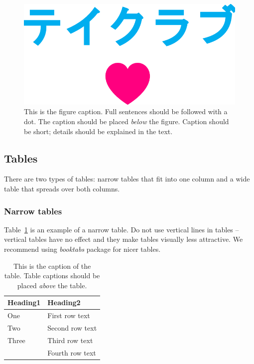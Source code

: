 \documentclass[10pt, a4paper]{article}
\begin{document}
\begin{figure}
\begin{center}
\includegraphics[width=\columnwidth]{drawing.pdf}
\caption{This is the figure caption. Full sentences should be followed with a dot. The caption should be placed \textit{below} the figure. Caption should be short; details should be explained in the text.}
\label{fig:figure1}
\end{center}
\end{figure}

\subsection{Tables}

There are two types of tables: narrow tables that fit into one column and a wide table that spreads over both columns.

\subsubsection{Narrow tables}

Table~\ref{tab:narrow-table} is an example of a narrow table. Do not use vertical lines in tables -- vertical tables have no effect and they make tables visually less attractive. We recommend using \textit{booktabs} package for nicer tables.

\begin{table}
\caption{This is the caption of the table. Table captions should be placed \textit{above} the table.}
\label{tab:narrow-table}
\begin{center}
\begin{tabular}{ll}
\toprule
Heading1 & Heading2 \\
\midrule
One & First row text \\
Two   & Second row text \\
Three   & Third row text \\
      & Fourth row text \\
\bottomrule
\end{tabular}
\end{center}
\end{table}
\end{document}
